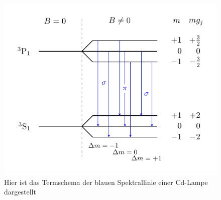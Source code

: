 \FloatBarrier
\begin{figure}[!h]
\centering
\includegraphics[scale=1.15]{../Grafiken/termschema_blau.pdf}
\caption{Hier ist das Termschema der blauen Spektrallinie einer Cd-Lampe dargestellt\label{fig:termschema_blau}}
\end{figure}
\FloatBarrier